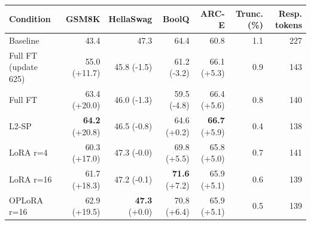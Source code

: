 \begin{tabular}{lrrrrrr}
\toprule
Condition & GSM8K & HellaSwag & BoolQ & ARC-E & Trunc. (\%) & Resp. tokens \\
\midrule
Baseline & 43.4 & 47.3 & 64.4 & 60.8 & 1.1 & 227 \\
Full FT (update 625) & 55.0 {\scriptsize(+11.7)} & 45.8 {\scriptsize(-1.5)} & 61.2 {\scriptsize(-3.2)} & 66.1 {\scriptsize(+5.3)} & 0.9 & 143 \\
\midrule
Full FT & 63.4 {\scriptsize(+20.0)} & 46.0 {\scriptsize(-1.3)} & 59.5 {\scriptsize(-4.8)} & 66.4 {\scriptsize(+5.6)} & 0.8 & 140 \\
L2-SP & \textbf{64.2} {\scriptsize(+20.8)} & 46.5 {\scriptsize(-0.8)} & 64.6 {\scriptsize(+0.2)} & \textbf{66.7} {\scriptsize(+5.9)} & 0.4 & 138 \\
LoRA r=4 & 60.3 {\scriptsize(+17.0)} & 47.3 {\scriptsize(-0.0)} & 69.8 {\scriptsize(+5.5)} & 65.8 {\scriptsize(+5.0)} & 0.7 & 141 \\
LoRA r=16 & 61.7 {\scriptsize(+18.3)} & 47.2 {\scriptsize(-0.1)} & \textbf{71.6} {\scriptsize(+7.2)} & 65.9 {\scriptsize(+5.1)} & 0.6 & 139 \\
OPLoRA r=16 & 62.9 {\scriptsize(+19.5)} & \textbf{47.3} {\scriptsize(+0.0)} & 70.8 {\scriptsize(+6.4)} & 65.9 {\scriptsize(+5.1)} & 0.5 & 139 \\
\bottomrule
\end{tabular}
